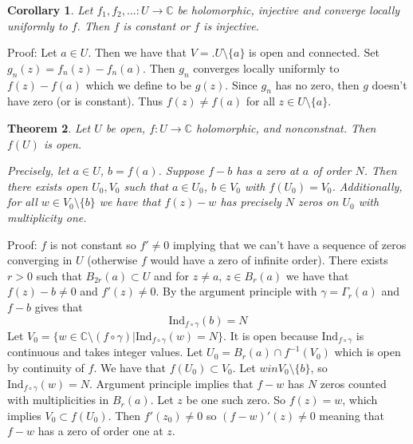 \documentclass[11pt]{article}
\theoremstyle{plain}
\newtheorem{theorem}{Theorem}[section]
\newtheorem{corollary}[theorem]{Corollary}
\theoremstyle{definition}
\newcommand{\C}{\mathbb{C}}
\newcommand{\Ind}{\text{Ind}}
\begin{document}
\begin{corollary}
Let $f_1, f_2, ... : U \to \C$ be holomorphic, injective and converge locally uniformly to $f$. Then $f$ is constant or $f$ is injective.
\end{corollary}

Proof: Let $a \in U$. Then we have that $V =.U \setminus \{ a \}$ is open and connected. Set $g_n(z) = f_n(z) - f_n(a)$. Then $g_n$ converges locally uniformly to $f(z) - f(a)$ which we define to be $g(z)$. Since $g_n$ has no zero, then $g$ doesn't have zero (or is constant). Thus $f(z) \neq f(a)$ for all $z \in U \setminus \{ a \}$.

\begin{theorem}
Let $U$ be open, $f: U \to \C$ holomorphic, and nonconstnat. Then $f(U)$ is open.

Precisely, let $a \in U$, $b = f(a)$. Suppose $f - b$ has a zero at $a$ of order $N$. Then there exists open $U_0, V_0$ such that $a \in U_0$, $b \in V_0$ with $f(U_0) = V_0$. Additionally, for all $w \in V_0 \setminus \{ b\}$ we have that $f(z) - w$ has precisely $N$ zeros on $U_0$ with multiplicity one.
\end{theorem}

Proof: $f$ is not constant so $f' \neq 0$ implying that we can't have a sequence of zeros converging in $U$ (otherwise $f$ would have a zero of infinite order). There exists $r > 0$ such that $B_{2r}(a) \subset U$ and for $z \neq a$, $z \in B_r(a)$ we have that $f(z) - b \neq 0$ and $f'(z) \neq 0$. By the argument principle with $\gamma = \Gamma_r(a)$ and $f-b$ gives that 
$$ \Ind_{f\circ\gamma}(b) = N $$
Let $V_0 = \{ w \in \C \setminus (f \circ \gamma ) | \Ind_{f\circ\gamma}(w) = N\}$. It is open because $\Ind_{f\circ\gamma}$ is continuous and takes integer values. Let $U_0 = B_r(a) \cap f^{-1}(V_0)$ which is open by continuity of $f$. We have that $f(U_0) \subset V_0$. Let $w in V_0 \setminus \{ b\}$, so $\Ind_{f\circ\gamma}(w) = N$. Argument principle implies that $f-w$ has $N$ zeros counted with multiplicities in $B_r(a)$. Let $z$ be one such zero. So $f(z) = w$, which implies $V_0 \subset f(U_0)$. Then $f'(z_0) \neq 0$ so $(f-w)'(z) \neq 0$ meaning that $f-w$ has a zero of order one at $z$.
\end{document}
